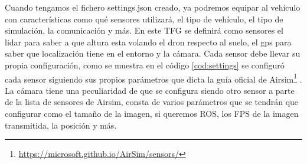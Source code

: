 Cuando tengamos el fichero settings.json creado, ya podremos equipar al vehículo con características como qué sensores utilizará, 
el tipo de vehículo, el tipo de simulación, la comunicación y más. En este TFG se definirá como sensores el lidar para saber a que altura esta volando 
el dron respecto al suelo, el gps para saber que localización tiene en el entorno y la cámara. Cada sensor debe llevar su propia configuración, como se muestra 
en el código \ref{cod:settings} se configuró cada sensor siguiendo sus propios parámetros que dicta la guía oficial de Airsim\footnote{\url{https://microsoft.github.io/AirSim/sensors/}}
. La cámara tiene una peculiaridad de que se configura siendo otro sensor a parte de la lista de sensores de Airsim, consta de varios parámetros que se tendrán que configurar como 
el tamaño de la imagen, si queremos ROS, los FPS de la imagen transmitida, la posición y más.

